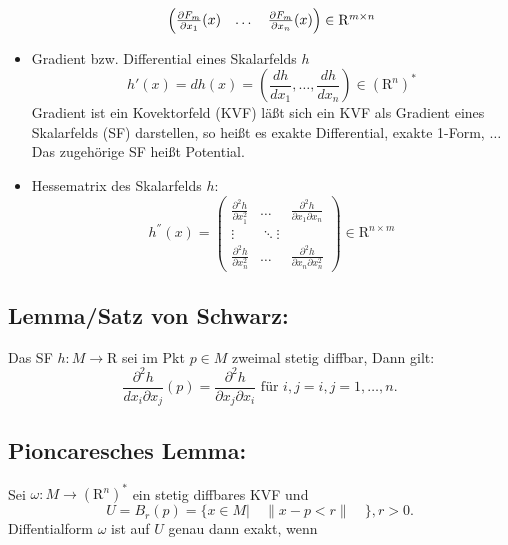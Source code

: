 \documentclass[ngerman]{tudscrreprt}
\begin{document}
\begin{itemize}
\begin{equation*}
\begin{array}{l l }
\begin{pmatrix}
\frac{\partial F_m}{\partial x_1}(x)&\dots & \frac{\partial F_m}{\partial x_n}(x)
\end{pmatrix} \in \mathrm{R}^{m\times n}
\end{array}
\end{equation*} 
\item Gradient bzw. Differential eines Skalarfelds $h$ 
\begin{equation*}
h'(x) = dh(x) = \left( \frac{dh}{dx_1}, \dots, \frac{dh}{dx_n} \right) \in (\mathrm{R}^n)^*
\end{equation*}
Gradient ist ein Kovektorfeld (KVF)
läßt sich ein KVF als Gradient eines Skalarfelds (SF) darstellen, so heißt es exakte Differential, exakte 1-Form, $\dots$ Das zugehörige SF heißt Potential.
\item Hessematrix des Skalarfelds $h$: 
\begin{equation*}
h^{''}(x) = \begin{pmatrix}
\frac{\partial^2 h}{\partial x_1^2} & \dots & \frac{\partial^2h}{\partial x_1\partial x_n}\\ 
\vdots& \ddots \vdots \\
\frac{\partial^2 h}{\partial x_n^2} & \dots & \frac{\partial^2h}{\partial x_n\partial x_n^2}
\end{pmatrix} \in \mathrm{R}^{n\times m}
\end{equation*}
\end{itemize}
\subsection*{Lemma/Satz von Schwarz:} 
Das SF 
$h: M\to \mathrm{R}$ sei im Pkt $p\in M$ zweimal stetig diffbar, Dann gilt: \begin{equation*}
\frac{\partial^2h}{dx_i \partial x_j}(p) = \frac{\partial^2h}{\partial x_j \partial x_i} \text{  für  } i,j = i,j=1,\dots, n.
\end{equation*}
\subsection*{Pioncaresches Lemma:} Sei $\omega: M \to (\mathrm{R}^n)^* $ ein stetig diffbares KVF und 
\begin{equation*}
U = B_r (p) = \{ x\in M | \quad \|{x-p}< r\|\quad \} , r>0.
\end{equation*}
Diffentialform $\omega$ ist auf $U$ genau dann exakt, wenn 
\end{document}
